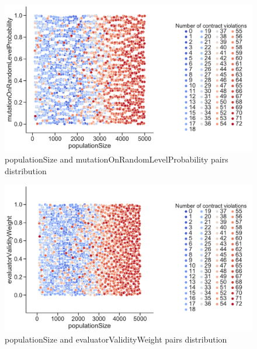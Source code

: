 \begin{figure}
	\centering
	\includegraphics[width=\textwidth]{images/PairsDistr/populationSize_mutationOnRandomLevelProbability.pdf}
	\caption[populationSize and mutationOnRandomLevelProbability pairs distribution]{populationSize and mutationOnRandomLevelProbability pairs distribution}
	\label{fig:populationSize_mutationOnRandomLevelProbability_pair}
\end{figure}
\begin{figure}
	\centering
	\includegraphics[width=\textwidth]{images/PairsDistr/populationSize_evaluatorValidityWeight.pdf}
	\caption[populationSize and evaluatorValidityWeight pairs distribution]{populationSize and evaluatorValidityWeight pairs distribution}
	\label{fig:populationSize_evaluatorValidityWeight_pair}
\end{figure}

